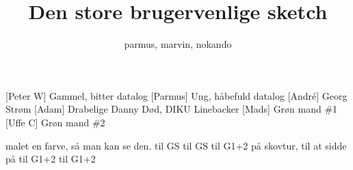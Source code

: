 \documentclass[a4paper,11pt]{article}
\title{Den store brugervenlige sketch}
\author{parmus, marvin, nokando}
\begin{document}
\maketitle

\begin{roles}
[Peter W] Gammel, bitter datalog
[Parmus] Ung, håbefuld datalog
[Andr\'e] Georg Strøm
[Adam] Drabelige Danny Død, DIKU Linebacker
[Mads] Grøn mand \#1
[Uffe C] Grøn mand \#2
\end{roles}

\begin{props}
 malet en farve, så man kan se den.
 til GS
 til GS
 til G1+2 på skovtur, til at sidde på
 til G1+2
 til G1+2
\end{props}
\end{document}
